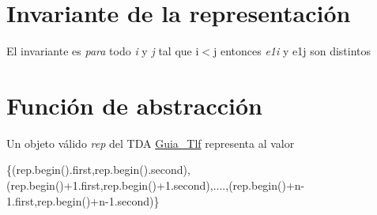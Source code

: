 \hypertarget{repGuia_Tlf_invGuia_Tlf}{}\section{Invariante de la representación}\label{repGuia_Tlf_invGuia_Tlf}
El invariante es {\itshape para} todo {\itshape i} y {\itshape j} tal que i$<$j entonces {\itshape e1i} y e1j son distintos\hypertarget{repGuia_Tlf_faGuia_Tlf}{}\section{Función de abstracción}\label{repGuia_Tlf_faGuia_Tlf}
Un objeto válido {\itshape rep} del T\+DA \mbox{\hyperlink{classGuia__Tlf}{Guia\+\_\+\+Tlf}} representa al valor

\{(rep.\+begin().first,rep.\+begin().second),(rep.\+begin()+1.first,rep.\+begin()+1.second),....,(rep.\+begin()+n-\/1.first,rep.\+begin()+n-\/1.second)\} 